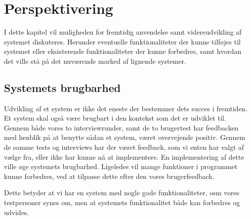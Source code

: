 \chapter{Perspektivering}
I dette kapitel vil muligheden for fremtidig anvendelse samt videreudvikling af systemet diskuteres.
Herunder eventuelle funktionaliteter der kunne tilføjes til systemet eller eksisterende funktionaliteter der kunne forbedres, samt hvordan det ville stå på det nuværende marked af lignende systemer.

\section{Systemets brugbarhed}
Udvikling af et system er ikke det eneste der bestemmer dets succes i fremtiden.
Et system skal også være brugbart i den kontekst som det er udviklet til.
Gennem både vores to interviewrunder, samt de to brugertest har feedbacken med henblik på at benytte sådan et system, været overvejende positiv.
Gennem de samme tests og interviews har der været feedback, som vi enten har valgt af vælge fra, eller ikke har kunne nå at implementere.
En implementering af dette ville øge systemets brugbarhed.
Ligeledes vil mange funktioner i programmet kunne forbedres, ved at tilpasse dette efter den vores brugerfeedback. 

Dette betyder at vi har en system med nogle gode funktionaliteter, osm vores testpersoner synes om, men at systemets funktionalitet både kan forbedres og udvides.


